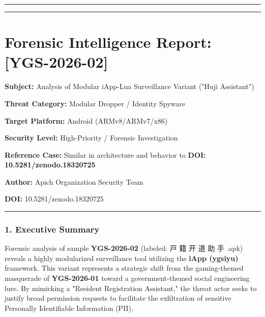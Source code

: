 \documentclass[
]{article}
\begin{document}
\begin{center}\rule{0.5\linewidth}{0.5pt}\end{center}

\begin{center}\rule{0.5\linewidth}{0.5pt}\end{center}

\section{\texorpdfstring{\textbf{Forensic Intelligence Report:
{[}YGS-2026-02{]}}}{Forensic Intelligence Report: {[}YGS-2026-02{]}}}\label{forensic-intelligence-report-ygs-2026-02}

\textbf{Subject:} Analysis of Modular iApp-Lua Surveillance Variant
("Huji Assistant")

\textbf{Threat Category:} Modular Dropper / Identity Spyware

\textbf{Target Platform:} Android (ARMv8/ARMv7/x86)

\textbf{Security Level:} High-Priority / Forensic Investigation

\textbf{Reference Case:} Similar in architecture and behavior to
\textbf{DOI: 10.5281/zenodo.18320725}

\textbf{Author:} Apich Organization Security Team

\textbf{DOI:} 10.5281/zenodo.18320725

\begin{center}\rule{0.5\linewidth}{0.5pt}\end{center}

\subsubsection{\texorpdfstring{\textbf{1. Executive
Summary}}{1. Executive Summary}}\label{1-executive-summary-2}

Forensic analysis of sample \textbf{YGS-2026-02} (labeled: 戸 籍 开 道
助 手 .apk) reveals a highly modularized surveillance tool utilizing the
\textbf{iApp (ygsiyu)} framework. This variant represents a strategic
shift from the gaming-themed masquerade of \textbf{YGS-2026-01} toward a
government-themed social engineering lure. By mimicking a "Resident
Registration Assistant," the threat actor seeks to justify broad
permission requests to facilitate the exfiltration of sensitive
Personally Identifiable Information (PII).
\end{document}
